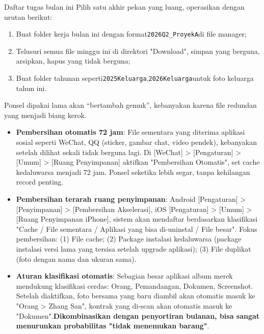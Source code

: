 \begin{tcbpractice}{Daftar tugas bulan ini}
Pilih satu akhir pekan yang luang, operasikan dengan urutan berikut:

\begin{enumerate}
  \item Buat folder kerja bulan ini dengan format\texttt{2026Q2\_ProyekA}di file manager;
  \item Telusuri semua file minggu ini di direktori "Download", simpan yang berguna, arsipkan, hapus yang tidak berguna;
  \item Buat folder tahunan seperti\texttt{2025Keluarga},\texttt{2026Keluarga}untuk foto keluarga tahun ini.
\end{enumerate}

\end{tcbpractice}


Ponsel dipakai lama akan “bertambah gemuk”, kebanyakan karena file redundan yang menjadi biang kerok.

\begin{itemize}
  \item \textbf{Pembersihan otomatis 72 jam}: File sementara yang diterima aplikasi sosial seperti WeChat, QQ (sticker, gambar chat, video pendek), kebanyakan setelah dilihat sekali tidak berguna lagi. Di [WeChat] > [Pengaturan] > [Umum] > [Ruang Penyimpanan] aktifkan "Pembersihan Otomatis", set cache kedaluwarsa menjadi 72 jam. Ponsel seketika lebih segar, tanpa kehilangan record penting.
  \item \textbf{Pembersihan terarah ruang penyimpanan}: Android [Pengaturan] > [Penyimpanan] > [Pembersihan Akselerasi], iOS [Pengaturan] > [Umum] > [Ruang Penyimpanan iPhone], sistem akan mendaftar berdasarkan klasifikasi "Cache / File sementara / Aplikasi yang bisa di-uninstal / File besar". Fokus pembersihan: (1) File cache; (2) Package instalasi kedaluwarsa (package instalasi versi lama yang tersisa setelah upgrade aplikasi); (3) File duplikat (foto dengan nama dan ukuran sama).
  \item \textbf{Aturan klasifikasi otomatis}: Sebagian besar aplikasi album merek mendukung klasifikasi cerdas: Orang, Pemandangan, Dokumen, Screenshot. Setelah diaktifkan, foto bersama yang baru diambil akan otomatis masuk ke "Orang > Zhang San", kontrak yang di-scan akan otomatis masuk ke "Dokumen".\textbf{Dikombinasikan dengan penyortiran bulanan, bisa sangat menurunkan probabilitas "tidak menemukan barang"}.
\end{itemize}

